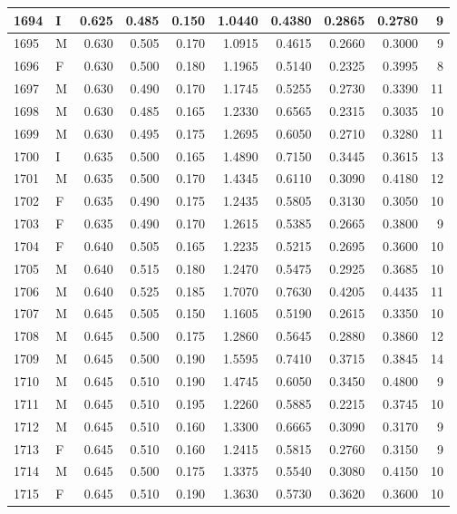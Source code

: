 \documentclass[9pt,twocolumn,twoside,]{pnas-new}
\begin{document}
\begin{tabular}{l|l|r|r|r|r|r|r|r|r}
\hline
1694 & I & 0.625 & 0.485 & 0.150 & 1.0440 & 0.4380 & 0.2865 & 0.2780 & 9\\
\hline
1695 & M & 0.630 & 0.505 & 0.170 & 1.0915 & 0.4615 & 0.2660 & 0.3000 & 9\\
\hline
1696 & F & 0.630 & 0.500 & 0.180 & 1.1965 & 0.5140 & 0.2325 & 0.3995 & 8\\
\hline
1697 & M & 0.630 & 0.490 & 0.170 & 1.1745 & 0.5255 & 0.2730 & 0.3390 & 11\\
\hline
1698 & M & 0.630 & 0.485 & 0.165 & 1.2330 & 0.6565 & 0.2315 & 0.3035 & 10\\
\hline
1699 & M & 0.630 & 0.495 & 0.175 & 1.2695 & 0.6050 & 0.2710 & 0.3280 & 11\\
\hline
1700 & I & 0.635 & 0.500 & 0.165 & 1.4890 & 0.7150 & 0.3445 & 0.3615 & 13\\
\hline
1701 & M & 0.635 & 0.500 & 0.170 & 1.4345 & 0.6110 & 0.3090 & 0.4180 & 12\\
\hline
1702 & F & 0.635 & 0.490 & 0.175 & 1.2435 & 0.5805 & 0.3130 & 0.3050 & 10\\
\hline
1703 & F & 0.635 & 0.490 & 0.170 & 1.2615 & 0.5385 & 0.2665 & 0.3800 & 9\\
\hline
1704 & F & 0.640 & 0.505 & 0.165 & 1.2235 & 0.5215 & 0.2695 & 0.3600 & 10\\
\hline
1705 & M & 0.640 & 0.515 & 0.180 & 1.2470 & 0.5475 & 0.2925 & 0.3685 & 10\\
\hline
1706 & M & 0.640 & 0.525 & 0.185 & 1.7070 & 0.7630 & 0.4205 & 0.4435 & 11\\
\hline
1707 & M & 0.645 & 0.505 & 0.150 & 1.1605 & 0.5190 & 0.2615 & 0.3350 & 10\\
\hline
1708 & M & 0.645 & 0.500 & 0.175 & 1.2860 & 0.5645 & 0.2880 & 0.3860 & 12\\
\hline
1709 & M & 0.645 & 0.500 & 0.190 & 1.5595 & 0.7410 & 0.3715 & 0.3845 & 14\\
\hline
1710 & M & 0.645 & 0.510 & 0.190 & 1.4745 & 0.6050 & 0.3450 & 0.4800 & 9\\
\hline
1711 & M & 0.645 & 0.510 & 0.195 & 1.2260 & 0.5885 & 0.2215 & 0.3745 & 10\\
\hline
1712 & M & 0.645 & 0.510 & 0.160 & 1.3300 & 0.6665 & 0.3090 & 0.3170 & 9\\
\hline
1713 & F & 0.645 & 0.510 & 0.160 & 1.2415 & 0.5815 & 0.2760 & 0.3150 & 9\\
\hline
1714 & M & 0.645 & 0.500 & 0.175 & 1.3375 & 0.5540 & 0.3080 & 0.4150 & 10\\
\hline
1715 & F & 0.645 & 0.510 & 0.190 & 1.3630 & 0.5730 & 0.3620 & 0.3600 & 10\\

\end{tabular}
\end{document}
